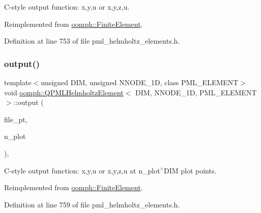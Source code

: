 C-\/style output function\+: x,y,u or x,y,z,u. 



Reimplemented from \hyperlink{classoomph_1_1FiniteElement_a72cddd09f8ddbee1a20a1ff404c6943e}{oomph\+::\+Finite\+Element}.



Definition at line 753 of file pml\+\_\+helmholtz\+\_\+elements.\+h.

\mbox{\label{classoomph_1_1QPMLHelmholtzElement_a9cfa0d9c0635140f394be49e15e58f93}} 
\subsubsection{\texorpdfstring{output()}{output()}\hspace{0.1cm}{\footnotesize\ttfamily [4/4]}}
{\footnotesize\ttfamily template$<$unsigned D\+IM, unsigned N\+N\+O\+D\+E\+\_\+1D, class P\+M\+L\+\_\+\+E\+L\+E\+M\+E\+NT$>$ \\
void \hyperlink{classoomph_1_1QPMLHelmholtzElement}{oomph\+::\+Q\+P\+M\+L\+Helmholtz\+Element}$<$ D\+IM, N\+N\+O\+D\+E\+\_\+1D, P\+M\+L\+\_\+\+E\+L\+E\+M\+E\+NT $>$\+::output (\begin{DoxyParamCaption}\item[{F\+I\+LE $\ast$}]{file\+\_\+pt,  }\item[{const unsigned \&}]{n\+\_\+plot }\end{DoxyParamCaption})\hspace{0.3cm}{\ttfamily [inline]}, {\ttfamily [virtual]}}



C-\/style output function\+: x,y,u or x,y,z,u at n\+\_\+plot$^\wedge$\+D\+IM plot points. 



Reimplemented from \hyperlink{classoomph_1_1FiniteElement_adfaee690bb0608f03320eeb9d110d48c}{oomph\+::\+Finite\+Element}.



Definition at line 759 of file pml\+\_\+helmholtz\+\_\+elements.\+h.

\mbox{\label{classoomph_1_1QPMLHelmholtzElement_a1697955b637445b14882b28ff8467f6e}} 
